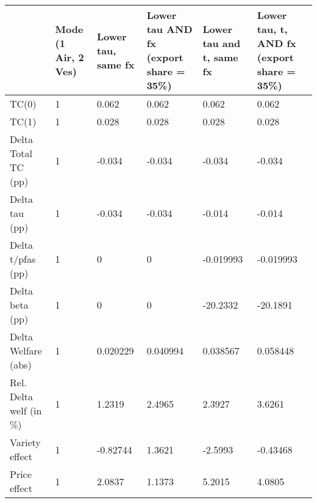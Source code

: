 \begin{tabular}{llllll}
& Mode (1 Air, 2 Ves) & Lower tau, same fx & Lower tau AND fx (export share = 35\%) & Lower tau and t, same fx & Lower tau, t, AND fx (export share = 35\%) \\
\hline
TC(0) & 1 & 0.062 & 0.062 & 0.062 & 0.062 \\
TC(1) & 1 & 0.028 & 0.028 & 0.028 & 0.028 \\
Delta Total TC (pp) & 1 & -0.034 & -0.034 & -0.034 & -0.034 \\
Delta tau (pp) & 1 & -0.034 & -0.034 & -0.014 & -0.014 \\
Delta t/pfas (pp) & 1 & 0 & 0 & -0.019993 & -0.019993 \\
Delta beta (pp) & 1 & 0 & 0 & -20.2332 & -20.1891 \\
Delta Welfare (abs) & 1 & 0.020229 & 0.040994 & 0.038567 & 0.058448 \\
Rel. Delta welf (in \%) & 1 & 1.2319 & 2.4965 & 2.3927 & 3.6261 \\
Variety effect & 1 & -0.82744 & 1.3621 & -2.5993 & -0.43468 \\
Price effect & 1 & 2.0837 & 1.1373 & 5.2015 & 4.0805 \\
\hline
\end{tabular} 